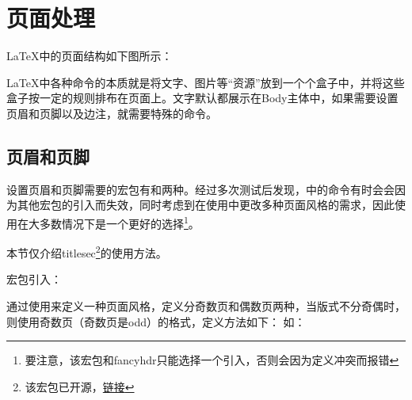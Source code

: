 \newpage
\section{页面处理}\label{sec:页面处理}
	\LaTeX 中的页面结构如下图所示：

    \layout{}

    \LaTeX{}中各种命令的本质就是将文字、图片等“资源”放到一个个盒子中，并将这些盒子按一定的规则排布在页面上。文字默认都展示在Body主体中，如果需要设置页眉和页脚以及边注，就需要特殊的命令。



    \subsection{页眉和页脚}
    设置页眉和页脚需要的宏包有和两种。经过多次测试后发现，中的命令有时会会因为其他宏包的引入而失效，同时考虑到在使用中更改多种页面风格的需求，因此使用在大多数情况下是一个更好的选择\footnote{要注意，该宏包和fancyhdr只能选择一个引入，否则会因为定义冲突而报错}。
    
    本节仅介绍titlesec\footnote{该宏包已开源，\href{https://github.com/jbezos/titlesec}{链接}}的使用方法。

    宏包引入：
    \begin{texcode}
        \usepackage{titlesec}
    \end{texcode}
    通过使用来定义一种页面风格，定义分奇数页和偶数页两种，当版式不分奇偶时，则使用奇数页（奇数页是odd）的格式，定义方法如下：
    如：
    
